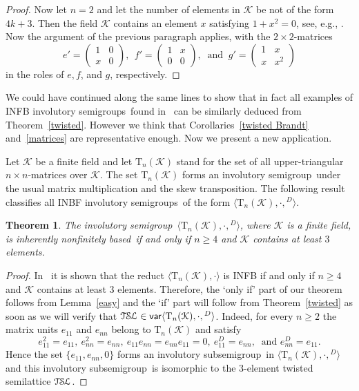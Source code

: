 \documentclass[smallextended]{svjour3}
\newcommand{\sgp}{semi\-group}
\newcommand{\is}{involutory semi\-group}
\newcommand{\iss}{involutory semi\-groups}
\newcommand{\infb}{inherently non\-finitely based}
\newcommand{\TSL}{\ensuremath{\mathcal{T\kern-.5pt S\kern-.5pt L}}}
\newtheorem{Thm}{Theorem}[section]
\DeclareMathOperator{\var}{\mathsf{var}}
\begin{document}
\begin{proof}
Now let $n=2$ and let the number of elements in $\mathcal{K}$ be not of the form $4k+3$. Then the field $\mathcal{K}$ contains an element
$x$ satisfying $1+x^2=0$, see, e.g., \cite[Theorem~3.75]{LidlNiederreiter}. Now the argument of the previous paragraph applies, with the
$2\times 2$-matrices
$$e'=\begin{pmatrix}
1 & 0 \\
x & 0
\end{pmatrix},\ \ f'=
\begin{pmatrix}
1 & x\\
0 & 0
\end{pmatrix},\ \text{ and }\
g'=
\begin{pmatrix}
1 & x \\
x & x^2
\end{pmatrix}$$
in the roles of $e,f$, and $g$, respectively.
\end{proof}

We could have continued along the same lines to show that in fact all examples of INFB \iss\ found in~\cite{Dolinka:2010,ADV:2012} can be
similarly deduced from Theorem~\ref{twisted}. However we think that Corollaries~\ref{twisted Brandt} and~\ref{matrices} are representative
enough. Now we present a new application.

Let $\mathcal{K}$ be a finite field and let $\mathrm{T}_n(\mathcal{K})$ stand for the set of all upper-triangular $n\times n$-matrices over
$\mathcal{K}$. The set $\mathrm{T}_n(\mathcal{K})$ forms an \is\ under the usual matrix multiplication and the skew transposition. The
following result classifies all INBF \iss\ of the form $\langle\mathrm{T}_n(\mathcal{K}),\cdot,{}^D\rangle$.

\begin{Thm}
\label{triangular} The \is\ $\langle\mathrm{T}_n(\mathcal{K}),\cdot,{}^D\rangle$, where $\mathcal{K}$ is a finite field, is \infb\ if and
only if $n\ge 4$ and $\mathcal{K}$ contains at least $3$ elements.
\end{Thm}

\begin{proof}
In~\cite{Goldberg&Volkov:2003} it is shown that the reduct $\langle\mathrm{T}_n(\mathcal{K}),\cdot\rangle$ is INFB if and only if $n\ge 4$
and $\mathcal{K}$ contains at least $3$ elements. Therefore, the `only if' part of our theorem follows from Lemma~\ref{easy} and the `if'
part will follow from Theorem~\ref{twisted} as soon as we will verify that $\TSL\in\var\langle\mathrm{T}_n(\mathcal{K}),\cdot,{}^D\rangle$.
Indeed, for every $n\ge2$ the matrix units $e_{11}$ and $e_{nn}$ belong to $\mathrm{T}_n(\mathcal{K})$ and satisfy
$$e_{11}^2=e_{11},\ e_{nn}^2=e_{nn},\ e_{11}e_{nn}=e_{nn}e_{11}=0,\ e_{11}^D=e_{nn},\ \text{ and } e_{nn}^D=e_{11}.$$
Hence the set $\{e_{11},e_{nn},0\}$ forms an involutory sub\sgp\ in $\langle\mathrm{T}_n(\mathcal{K}),\cdot,{}^D\rangle$ and this
involutory sub\sgp\ is isomorphic to the 3-element twisted semilattice $\TSL$.
\end{proof}
\end{document}
